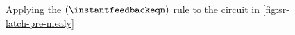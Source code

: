 \begin{figure}
    \centering
    \caption{
        Applying the \((\instantfeedbackeqn)\) rule to the circuit in
        \cref{fig:sr-latch-pre-mealy}
    }
    \label{fig:sr-latch-unrolled}
\end{figure}